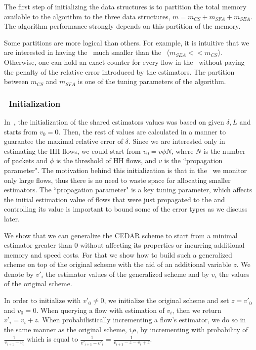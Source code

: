 The first step of initializing the data structures is to partition the total memory available to the algorithm to the three data structures, $m = m_{CS}+m_{SFA}+m_{SEA}$. The algorithm  performance strongly depends on this partition of the memory.

Some partitions are more logical than others. For example, it is intuitive that we are interested in having the \sea\ much smaller than the \cs\ ($m_{SEA} << m_{CS}$). Otherwise, one can hold an exact counter for every flow in the \cs\ without paying the penalty of the relative error introduced by the estimators. The partition between $m_{CS}$ and $m_{SFA}$ is one of the tuning parameters of the algorithm.

\subsubsection{\sea\ Initialization}
In~\cite{CEDAR}, the initialization of the shared estimators values was based on given $\delta, L$ and starts from $v_0=0$. Then, the rest of values are calculated in a manner to guarantee the maximal relative error of $\delta$.  Since we are interested only in estimating the HH flows, we could start from $v_0=v\phi N$, where $N$ is the number of packets and $\phi$ is the threshold of HH flows, and $v$ is the ``propagation parameter". The motivation behind this initialization is that in the \cs\ we  monitor only large flows, thus there is no need to waste space for allocating smaller estimators. The ``propagation parameter" is a key tuning parameter, which affects the initial estimation value of flows that were just propagated to the \cs and controlling its value is important to bound some of the error types as we discuss later.

We show that we can generalize the CEDAR scheme to start from a minimal estimator greater than $0$ without affecting its properties or incurring additional memory and speed costs. For that we show how to build such a generalized scheme on top of the original scheme with the aid of an additional variable $z$. We denote by $v'_i$ the estimator values of the generalized scheme and by $v_i$ the values of the original scheme.

In order to initialize with $v'_0\neq 0$, we initialize the original scheme and set $z=v'_0$ and $v_0=0$. When querying a flow with estimation of $v_i$, then we return $v'_i=v_i+z$. When probabilistically incrementing a flow's estimator, we do so in the same manner as the original scheme, i,e, by incrementing with probability of $\frac{1}{v_{i+1}-v_{i}}$ which is equal to $\frac{1}{v'_{i+1}-v'_{i}}=\frac{1}{v_{i+1}-z-v_{i}+z}$.

